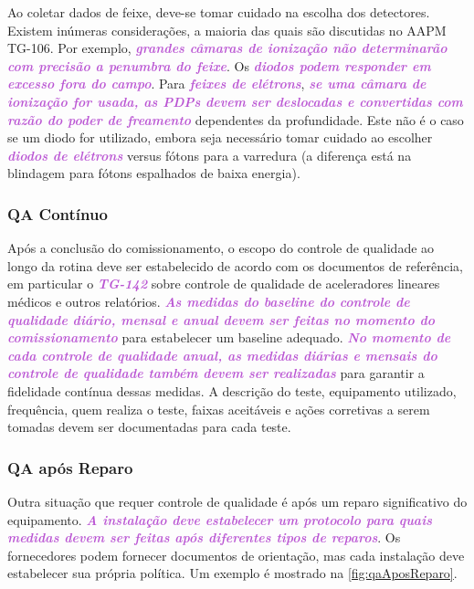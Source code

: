 \documentclass[11pt,a4paper]{article}
\newcounter{exemplo}
\begin{document}
	Ao coletar dados de feixe, deve-se tomar cuidado na escolha dos detectores. Existem inúmeras considerações, a maioria das quais são discutidas no AAPM TG-106. Por exemplo, \textcolor{MediumOrchid}{\textbf{\textit{grandes câmaras de ionização não determinarão com precisão a penumbra do feixe}}}. Os \textcolor{MediumOrchid}{\textbf{\textit{diodos podem responder em excesso fora do campo}}}. Para \textcolor{MediumOrchid}{\textbf{\textit{feixes de elétrons}}}, \textcolor{MediumOrchid}{\textbf{\textit{se uma câmara de ionização for usada, as PDPs devem ser deslocadas e convertidas com razão do poder de freamento}}} dependentes da profundidade. Este não é o caso se um diodo for utilizado, embora seja necessário tomar cuidado ao escolher \textcolor{MediumOrchid}{\textbf{\textit{diodos de elétrons}}} versus fótons para a varredura (a diferença está na blindagem para fótons espalhados de baixa energia).

\subsubsection*{QA Contínuo}

	Após a conclusão do comissionamento, o escopo do controle de qualidade ao longo da rotina deve ser estabelecido de acordo com os documentos de referência, em particular o \textcolor{MediumOrchid}{\textbf{\textit{TG-142}}} sobre controle de qualidade de aceleradores lineares médicos e outros relatórios. \textcolor{MediumOrchid}{\textbf{\textit{As medidas do baseline do controle de qualidade diário, mensal e anual devem ser feitas no momento do comissionamento}}} para estabelecer um baseline adequado. \textcolor{MediumOrchid}{\textbf{\textit{No momento de cada controle de qualidade anual, as medidas diárias e mensais do controle de qualidade também devem ser realizadas}}} para garantir a fidelidade contínua dessas medidas. A descrição do teste, equipamento utilizado, frequência, quem realiza o teste, faixas aceitáveis e ações corretivas a serem tomadas devem ser documentadas para cada teste.

\subsubsection*{QA após Reparo}

	Outra situação que requer controle de qualidade é após um reparo significativo do equipamento. \textcolor{MediumOrchid}{\textbf{\textit{A instalação deve estabelecer um protocolo para quais medidas devem ser feitas após diferentes tipos de reparos}}}. Os fornecedores podem fornecer documentos de orientação, mas cada instalação deve estabelecer sua própria política. Um exemplo é mostrado na \ref{fig:qaAposReparo}.
\end{document}
